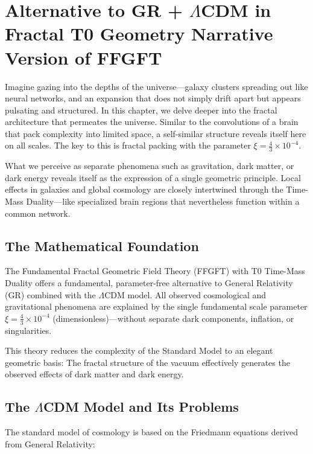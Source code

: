 \chapter{Alternative to GR + $\Lambda$CDM in Fractal T0 Geometry  Narrative Version of FFGFT}


	
	Imagine gazing into the depths of the universe—galaxy clusters spreading out like neural networks, and an expansion that does not simply drift apart but appears pulsating and structured. In this chapter, we delve deeper into the fractal architecture that permeates the universe. Similar to the convolutions of a brain that pack complexity into limited space, a self-similar structure reveals itself here on all scales. The key to this is fractal packing with the parameter $\xi = \frac{4}{3} \times 10^{-4}$.
	
	What we perceive as separate phenomena such as gravitation, dark matter, or dark energy reveals itself as the expression of a single geometric principle. Local effects in galaxies and global cosmology are closely intertwined through the Time-Mass Duality—like specialized brain regions that nevertheless function within a common network.
	
	\section*{The Mathematical Foundation}
	
	The Fundamental Fractal Geometric Field Theory (FFGFT) with T0 Time-Mass Duality offers a fundamental, parameter-free alternative to General Relativity (GR) combined with the $\Lambda$CDM model. All observed cosmological and gravitational phenomena are explained by the single fundamental scale parameter $\xi = \frac{4}{3} \times 10^{-4}$ (dimensionless)—without separate dark components, inflation, or singularities.
	
	This theory reduces the complexity of the Standard Model to an elegant geometric basis: The fractal structure of the vacuum effectively generates the observed effects of dark matter and dark energy.
	
	\section*{The $\Lambda$CDM Model and Its Problems}
	
	The standard model of cosmology is based on the Friedmann equations derived from General Relativity:
	
